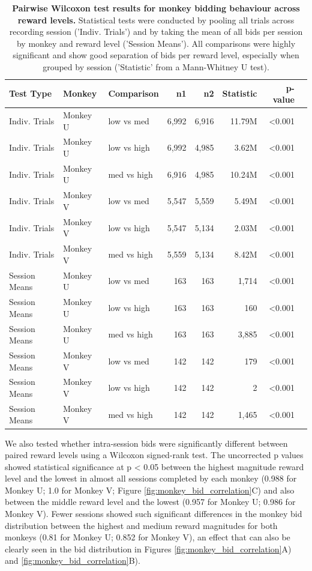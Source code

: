 \begin{table}[ht]
\centering
\small
\begin{tabular}{lllrrrrl}
\hline
\textbf{Test Type} & \textbf{Monkey} & \textbf{Comparison} & \textbf{n1} & \textbf{n2} & \textbf{Statistic} & \textbf{p-value} \\
\hline
Indiv. Trials & Monkey U & low vs med & 6,992 & 6,916 & 11.79M & <0.001 \\
Indiv. Trials & Monkey U & low vs high & 6,992 & 4,985 & 3.62M & <0.001 \\
Indiv. Trials & Monkey U & med vs high & 6,916 & 4,985 & 10.24M & <0.001 \\
\hline
Indiv. Trials & Monkey V & low vs med & 5,547 & 5,559 & 5.49M & <0.001 \\
Indiv. Trials & Monkey V & low vs high & 5,547 & 5,134 & 2.03M & <0.001 \\
Indiv. Trials & Monkey V & med vs high & 5,559 & 5,134 & 8.42M & <0.001 \\
\hline
Session Means & Monkey U & low vs med & 163 & 163 & 1,714 & <0.001 \\
Session Means & Monkey U & low vs high & 163 & 163 & 160 & <0.001 \\
Session Means & Monkey U & med vs high & 163 & 163 & 3,885 & <0.001 \\
\hline
Session Means & Monkey V & low vs med & 142 & 142 & 179 & <0.001 \\
Session Means & Monkey V & low vs high & 142 & 142 & 2 & <0.001 \\
Session Means & Monkey V & med vs high & 142 & 142 & 1,465 & <0.001 \\
\hline
\end{tabular}
\caption[Pairwise Wilcoxon test results for monkey bidding behaviour across reward levels.]{\textbf{Pairwise Wilcoxon test results for monkey bidding behaviour across reward levels.} Statistical tests were conducted by pooling all trials across recording session ('Indiv. Trials') and by taking the mean of all bids per session by monkey and reward level ('Session Means'). All comparisons were highly significant and show good separation of bids per reward level, especially when grouped by session ('Statistic' from a Mann-Whitney U test).}
\label{tab:monkey_reward_level}
\end{table}

We also tested whether intra-session bids were significantly different between paired reward levels using a Wilcoxon signed-rank test. The uncorrected p values showed statistical significance at p < 0.05 between the highest magnitude reward level and the lowest in almost all sessions completed by each monkey (0.988 for Monkey U; 1.0 for Monkey V; Figure \ref{fig:monkey_bid_correlation}C) and also between the middle reward level and the lowest (0.957 for Monkey U; 0.986 for Monkey V). Fewer sessions showed such significant differences in the monkey bid distribution between the highest and medium reward magnitudes for both monkeys (0.81 for Monkey U; 0.852 for Monkey V), an effect that can also be clearly seen in the bid distribution in Figures \ref{fig:monkey_bid_correlation}A) and \ref{fig:monkey_bid_correlation}B).

